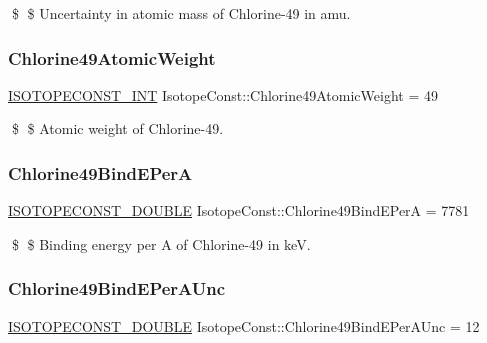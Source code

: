 \$ \$ Uncertainty in atomic mass of Chlorine-\/49 in amu. \mbox{\label{group___isotope_const-_chlorine-_cl49_gab1a0263f19a7c66dfaaecab0cc2be850}} 
\subsubsection{\texorpdfstring{Chlorine49\+Atomic\+Weight}{Chlorine49AtomicWeight}}
{\footnotesize\ttfamily \mbox{\hyperlink{group___isotope_const-_macros_ga5f18360b3e99483a35c32d789e62621c}{I\+S\+O\+T\+O\+P\+E\+C\+O\+N\+S\+T\+\_\+\+I\+NT}} Isotope\+Const\+::\+Chlorine49\+Atomic\+Weight = 49}

\$ \$ Atomic weight of Chlorine-\/49. \mbox{\label{group___isotope_const-_chlorine-_cl49_ga36058f3b27d633e209a56fa6ba61e3e0}} 
\subsubsection{\texorpdfstring{Chlorine49\+Bind\+E\+PerA}{Chlorine49BindEPerA}}
{\footnotesize\ttfamily \mbox{\hyperlink{group___isotope_const-_macros_ga8f45a7272ce02c0b4c65c44636ed719a}{I\+S\+O\+T\+O\+P\+E\+C\+O\+N\+S\+T\+\_\+\+D\+O\+U\+B\+LE}} Isotope\+Const\+::\+Chlorine49\+Bind\+E\+PerA = 7781}

\$ \$ Binding energy per A of Chlorine-\/49 in keV. \mbox{\label{group___isotope_const-_chlorine-_cl49_ga5be058f0688c3bbf8b18e4399a10ae54}} 
\subsubsection{\texorpdfstring{Chlorine49\+Bind\+E\+Per\+A\+Unc}{Chlorine49BindEPerAUnc}}
{\footnotesize\ttfamily \mbox{\hyperlink{group___isotope_const-_macros_ga8f45a7272ce02c0b4c65c44636ed719a}{I\+S\+O\+T\+O\+P\+E\+C\+O\+N\+S\+T\+\_\+\+D\+O\+U\+B\+LE}} Isotope\+Const\+::\+Chlorine49\+Bind\+E\+Per\+A\+Unc = 12}

